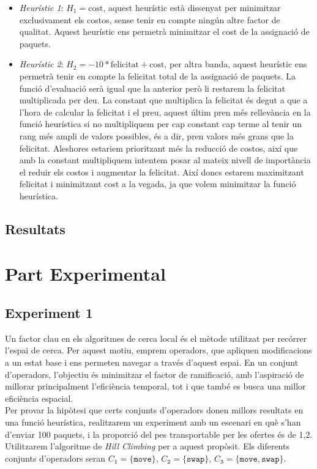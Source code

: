 \documentclass[a4paper]{article}
\begin{document}
	\begin{itemize}
		\item \emph{Heurístic 1}: $H_1 = \text{cost}$, aquest heurístic està dissenyat per minimitzar exclusivament els costos, sense tenir en compte ningún altre factor de qualitat. Aquest heurístic ens permetrà minimitzar el cost de la assignació de paquets.
		\item \emph{Heurístic 2}: $H_2 = -10*\text{felicitat} + \text{cost}$, per altra banda, aquest heurístic ens permetrà tenir en compte la felicitat total de la assignació de paquets. La funció d'evaluació serà igual que la anterior però li restarem la felicitat multiplicada per deu. La constant que multiplica la felicitat és degut a que a l'hora de calcular la felicitat i el preu, aquest últim pren més rellevància en la funció heurística si no multipliquem per cap constant cap terme al tenir un rang més ampli de valors possibles, és a dir, pren valors més grans que la felicitat. Aleshores estariem prioritzant més la reducció de costos, així que amb la constant multipliquem intentem posar al mateix nivell de importància el reduir els costos i augmentar la felicitat. Així doncs estarem maximitzant felicitat i minimitzant cost a la vegada, ja que volem minimitzar la funció heurística.
	\end{itemize}
	
	\subsection{Resultats}
	
	\newpage
	\section{Part Experimental}
	
	\subsection{Experiment 1}
	
	Un factor clau en els algoritmes de cerca local és el mètode utilitzat per recórrer l'espai de cerca. Per aquest motiu, emprem operadors, que apliquen modificacions a un estat base i ens permeten navegar a través d'aquest espai. En un conjunt d'operadors, l'objectiu és minimitzar el factor de ramificació, amb l'aspiració de millorar principalment l'eficiència temporal, tot i que també es busca una millor eficiència espacial. \\
	
	Per provar la hipòtesi que certs conjunts d'operadors donen millors resultats en una funció heurística, realitzarem un experiment amb un escenari en què s'han d'enviar 100 paquets, i la proporció del pes transportable per les ofertes és de 1,2. Utilitzarem l'algoritme de \textit{Hill Climbing} per a aquest propòsit. Els diferents conjunts d'operadors seran $C_{\texttt{1}} = \{\texttt{move}\}$, $C_{\texttt{2}} = \{\texttt{swap}\}$, $C_{\texttt{3}} = \{\texttt{move}, \texttt{swap}\}$. \\
	
\end{document}
